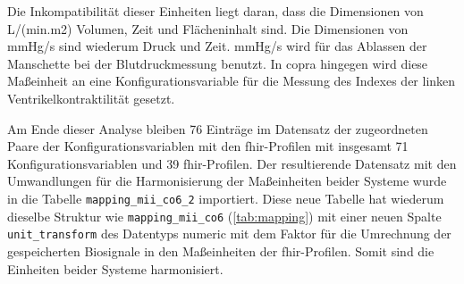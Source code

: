 Die Inkompatibilität dieser Einheiten liegt daran, dass die Dimensionen von L/(min.m2) Volumen, Zeit und Flächeninhalt sind. Die Dimensionen von mmHg/s sind wiederum Druck und Zeit.  mmHg/s wird für das Ablassen der Manschette bei der Blutdruckmessung benutzt. In \ac{copra} hingegen wird diese Maßeinheit an eine Konfigurationsvariable für die Messung des Indexes der linken Ventrikelkontraktilität gesetzt.

Am Ende dieser Analyse bleiben 76 Einträge im Datensatz der zugeordneten Paare der Konfigurationsvariablen mit den \ac{fhir}-Profilen mit insgesamt 71 Konfigurationsvariablen und 39 \ac{fhir}-Profilen. Der resultierende Datensatz mit den Umwandlungen für die Harmonisierung der Maßeinheiten beider Systeme wurde in die Tabelle \texttt{mapping\_mii\_co6\_2} importiert. Diese neue Tabelle hat wiederum dieselbe Struktur wie \texttt{mapping\_mii\_co6} (\ref{tab:mapping}) mit einer neuen Spalte \texttt{unit\_transform} des Datentyps \glqq numeric\grqq{} mit dem Faktor für die Umrechnung der gespeicherten Biosignale in den Maßeinheiten der \ac{fhir}-Profilen. Somit sind die Einheiten beider Systeme harmonisiert.